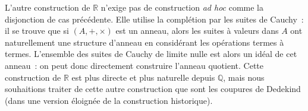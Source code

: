 \begin{remark}
  L'autre construction de $\mathbb R$ n'exige pas de construction
  \textit{ad hoc} comme la disjonction de cas précédente. Elle utilise la
  complétion par les suites de Cauchy~: il se trouve que si $(A,+,\times)$ est
  un anneau, alors les suites à valeurs dans $A$ ont naturellement une structure
  d'anneau en considérant les opérations termes à termes. L'ensemble des suites
  de Cauchy de limite nulle est alors un idéal de cet anneau~: on peut donc
  directement construire l'anneau quotient. Cette construction de $\mathbb R$
  est plus directe et plus naturelle depuis $\mathbb Q$, mais nous souhaitions
  traiter de cette autre construction que sont les coupures de Dedekind (dans
  une version éloignée de la construction historique).
\end{remark}
